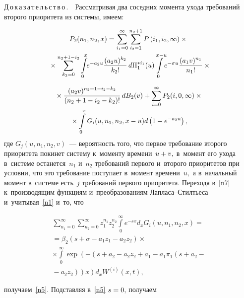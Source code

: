 \begin{multicols}{2}
\noindent
Д\,о\,к\,а\,з\,а\,т\,е\,л\,ь\,с\,т\,в\,о\,.\ \
Рассматривая два соседних момента ухода требований второго
 приоритета из системы, имеем:
 
 \vspace*{-6pt}
 
 \noindent
\begin{multline*}
P_2(n_1,n_2,x)=\sum\limits_{i_1=0}^{\infty}
\sum\limits_{i_2=1}^{n_2+1}P\left(i_1,i_2,\infty\right)\times{}\\[-1pt]
{}\times \sum\limits_{k_2=0}^{n_2+1-i_2}
\int\limits_0^x \!\! e^{-a_2u}\displaystyle\frac{\displaystyle (a_2u)^{k_2}\mathstrut}{\displaystyle k_2!\mathstrut}\,
d\Pi_1^{*i_1}(u)\!\int\limits_0^{x-u}  \!\!e^{-\sigma u}\displaystyle\frac{\displaystyle (a_1v)^{n_1}\mathstrut}{\displaystyle n_1!\mathstrut}
\times{}\hspace*{-3.60439pt}
\end{multline*}

\noindent
\begin{multline}
{}\times\displaystyle\frac{\displaystyle (a_2v)^{n_2+1-i_2-k_2}\mathstrut}{\displaystyle (n_2+1-i_2-k_2)!\mathstrut}\,dB_2(v)+
\sum\limits_{i=0}^{\infty}P_2(i,0,\infty)\times{}\\
{}\times
\int\limits_0^xG_i(u,n_1,n_2,x-u)d\left(1-e^{-a_2u}\right),
\label{n7}
\end{multline}
где
$G_j(u,n_1,n_2,v)$~--- вероятность того, что первое требование второго 
приоритета покинет систему к~моменту времени~$u\hm+v,$
в~момент его ухода в~системе останется~$n_1$ и~$n_2$ требований первого и~второго 
приоритетов при условии, что это требование поступает
в~момент времени~$u,$ а в~начальный момент
в~системе есть~$j$  требований первого приоритета.  Переходя 
в~\eqref{n7} к~производящим функциям и~преобразованиям Лап\-ла\-са--Стилть\-еса 
и~учитывая~\eqref{n1} и~то, что

\vspace*{-3pt}

\noindent
\begin{multline*}
\sum\limits_{n_1=0}^{\infty}\sum\limits_{n_2=0}^{\infty}
z_1^{n_1}z_2^{n_2}\int\limits_0^{\infty}e^{-sx}
d_xG_i(u,n_1,n_2,x)={}\\
{}=\beta_2(s+\sigma-a_1z_1-a_2z_2)\times\\
\times \int\limits_0^{\infty}\!
\exp\left(-\left(s+a_2-a_2z_2+a_1-a_1\pi_1\left(s+a_2-{}\right.\right.\right.\\
\left.\left.\left.{}-a_2z_2\right)\right)x\right)
d_x W^{(i)}(x,t),
\end{multline*}

\vspace*{-3pt}

\noindent
получаем~\eqref{n5}. Подставляя в~\eqref{n5} $s\hm=0,$ получаем


\end{multicols}
